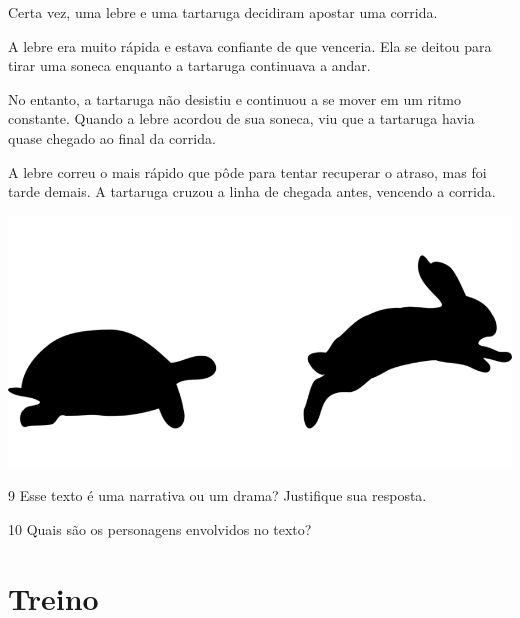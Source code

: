 \begin{minipage}{.5\textwidth}
\begin{myquote}
Certa vez, uma lebre e uma tartaruga decidiram apostar uma corrida.

A lebre era muito rápida e estava confiante de que venceria. Ela se
deitou para tirar uma soneca enquanto a tartaruga continuava a andar.

No entanto, a tartaruga não desistiu e continuou a se mover em um ritmo
constante. Quando a lebre acordou de sua soneca, viu que a tartaruga
havia quase chegado ao final da corrida.

A lebre correu o mais rápido que pôde para tentar recuperar o atraso,
mas foi tarde demais. A tartaruga cruzou a linha de chegada antes,
vencendo a corrida.

\end{myquote}

\end{minipage}
\begin{minipage}{.5\textwidth}
\includegraphics[width=\textwidth]{./imgs/img6.png}
\end{minipage}

\bigskip\bigskip\bigskip
\num{9} Esse texto é uma narrativa ou um drama? Justifique sua resposta.


\num{10} Quais são os personagens envolvidos no texto?


\pagebreak

\section*{Treino}


